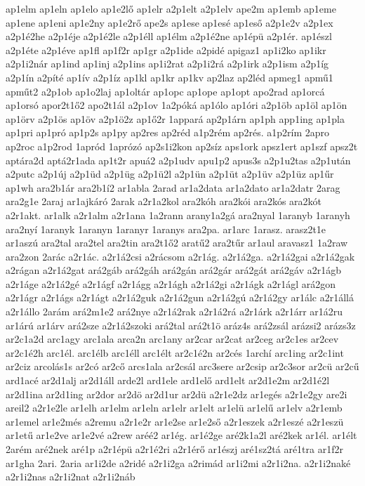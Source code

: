 {ap1elm
ap1eln
ap1elo
ap1e2lő
ap1elr
a2p1elt
a2p1elv
ape2m
ap1emb
ap1eme
ap1ene
ap1eni
ap1e2ny
ap1e2rő
ape2s
ap1ese
ap1esé
ap1eső
a2p1e2v
a2p1ex
a2p1é2he
a2p1éje
a2p1é2le
a2p1éll
ap1élm
a2p1é2ne
ap1épü
a2p1ér.
ap1észl
a2p1éte
a2p1éve
ap1fl
ap1f2r
ap1gr
a2p1ide
a2pidé
apigaz1
ap1i2ko
ap1ikr
a2p1i2nár
ap1ind
ap1inj
a2p1ins
ap1i2rat
a2p1i2rá
a2p1irk
a2p1ism
a2p1íg
a2p1ín
a2píté
ap1ív
a2p1íz
ap1kl
ap1kr
ap1kv
ap2laz
ap2léd
apmeg1
apmű1
apműt2
a2p1ob
ap1o2laj
ap1oltár
ap1opc
ap1ope
ap1opt
apo2rad
ap1orcá
ap1orsó
apor2t1ő2
apo2t1ál
a2p1ov
1a2póká
ap1ólo
ap1óri
a2p1öb
ap1öl
ap1ön
ap1örv
a2p1ös
ap1öv
a2p1ö2z
ap1ő2r
1appará
ap2p1árn
ap1ph
app1ing
ap1pla
ap1pri
ap1pró
ap1p2s
ap1py
ap2res
ap2réd
a1p2rém
ap2rés.
a1p2rím
2apro
ap2roc
a1p2rod
1apród
1aprózó
ap2s1i2kon
ap2síz
aps1ork
apsz1ert
ap1szf
apsz2t
aptára2d
aptá2r1ada
ap1t2r
apuá2
a2p1udv
apu1p2
apus3s
a2p1u2tas
a2p1után
a2putc
a2p1új
a2p1üd
a2p1üg
a2p1ü2l
a2p1ün
a2p1üt
a2p1üv
a2p1üz
ap1űr
ap1wh
ara2b1ár
ara2b1í2
ar1abla
2arad
ar1a2data
ar1a2dato
ar1a2datr
2arag
ara2g1e
2araj
ar1ajkáró
2arak
a2r1a2kol
ara2kóh
ara2kói
ara2kós
ara2kót
a2r1akt.
ar1alk
a2r1alm
a2r1ana
1a2rann
arany1a2gá
ara2nyal
1aranyb
1aranyh
ara2nyí
1aranyk
1aranyn
1aranyr
1aranys
ara2pa.
ar1arc
1arasz.
arasz2t1e
ar1aszú
ara2tal
ara2tel
ara2tin
ara2t1ő2
aratű2
ara2tűr
ar1aul
aravasz1
1a2raw
ara2zon
2arác
a2r1ác.
a2r1á2csi
a2rácsom
a2r1ág.
a2r1á2ga.
a2r1á2gai
a2r1á2gak
a2rágan
a2r1á2gat
ará2gáb
ará2gáh
ará2gán
ará2gár
ará2gát
ará2gáv
a2r1ágb
a2r1áge
a2r1á2gé
a2r1ágf
a2r1ágg
a2r1ágh
a2r1á2gi
a2r1ágk
a2r1ágl
ará2gon
a2r1ágr
a2r1ágs
a2r1ágt
a2r1á2guk
a2r1á2gun
a2r1á2gú
a2r1á2gy
ar1álc
a2r1állá
a2r1állo
2arám
ará2m1e2
ará2nye
a2r1á2rak
a2r1á2rá
a2r1árk
a2r1árr
ar1á2ru
ar1árú
ar1árv
ará2sze
a2r1á2szoki
ará2tal
ará2t1ö
aráz4s
ará2zsál
arázsi2
arázs3z
ar2c1a2d
arc1agy
arc1ala
arca2n
arc1any
ar2car
ar2cat
ar2ceg
ar2c1es
ar2cev
ar2c1é2h
arc1él.
arc1élb
arc1éll
arc1élt
ar2c1é2n
ar2cés
1archí
arc1ing
ar2c1int
ar2ciz
arcolás1s
ar2có
ar2cő
arcs1ala
ar2csál
arc3sere
ar2csip
ar2c3sor
ar2cü
ar2cű
ard1acé
ar2d1alj
ar2d1áll
arde2l
ard1ele
ard1elő
ard1elt
ar2d1e2m
ar2d1é2l
ar2d1ina
ar2d1ing
ar2dor
ar2dö
ar2d1ur
ar2dü
a2r1e2dz
ar1egés
a2r1e2gy
are2i
areil2
a2r1e2le
ar1elh
ar1elm
ar1eln
ar1elr
ar1elt
ar1elü
ar1elű
ar1elv
a2r1emb
ar1emel
ar1e2més
a2remu
a2r1e2r
ar1e2se
ar1e2ső
a2r1eszek
a2r1eszé
a2r1eszü
ar1etű
ar1e2ve
ar1e2vé
a2rew
aréé2
ar1ég.
ar1é2ge
aré2k1a2l
aré2kek
ar1él.
ar1élt
2arém
aré2nek
aré1p
a2r1épü
a2r1é2ri
a2r1érő
ar1észj
aré1sz2tá
aré1tra
ar1f2r
ar1gha
2ari.
2aria
ar1i2de
a2ridé
a2r1i2ga
a2rimád
ar1i2mi
a2r1i2na.
a2r1i2naké
a2r1i2nas
a2r1i2nat
a2r1i2náb
}
